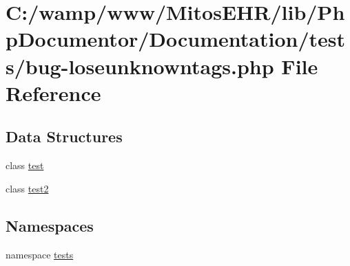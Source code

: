 \hypertarget{bug-loseunknowntags_8php}{\section{\-C\-:/wamp/www/\-Mitos\-E\-H\-R/lib/\-Php\-Documentor/\-Documentation/tests/bug-\/loseunknowntags.php \-File \-Reference}
\label{bug-loseunknowntags_8php}
}
\subsection*{\-Data \-Structures}
\begin{DoxyCompactItemize}
\item 
class \hyperlink{classtest}{test}
\item 
class \hyperlink{classtest2}{test2}
\end{DoxyCompactItemize}
\subsection*{\-Namespaces}
\begin{DoxyCompactItemize}
\item 
namespace \hyperlink{namespacetests}{tests}
\end{DoxyCompactItemize}
